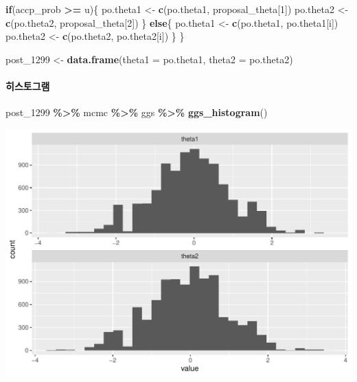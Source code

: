 \documentclass[
]{article}
\newenvironment{Shaded}{\begin{snugshade}}{\end{snugshade}}
\newcommand{\AttributeTok}[1]{\textcolor[rgb]{0.13,0.29,0.53}{#1}}
\newcommand{\ControlFlowTok}[1]{\textcolor[rgb]{0.13,0.29,0.53}{\textbf{#1}}}
\newcommand{\DecValTok}[1]{\textcolor[rgb]{0.00,0.00,0.81}{#1}}
\newcommand{\FunctionTok}[1]{\textcolor[rgb]{0.13,0.29,0.53}{\textbf{#1}}}
\newcommand{\NormalTok}[1]{#1}
\newcommand{\OtherTok}[1]{\textcolor[rgb]{0.56,0.35,0.01}{#1}}
\newcommand{\SpecialCharTok}[1]{\textcolor[rgb]{0.81,0.36,0.00}{\textbf{#1}}}
\begin{document}
\begin{Shaded}
\begin{Highlighting}[]
  \ControlFlowTok{if}\NormalTok{(accp\_prob }\SpecialCharTok{\textgreater{}=}\NormalTok{ u)\{}
\NormalTok{    po.theta1 }\OtherTok{\textless{}{-}} \FunctionTok{c}\NormalTok{(po.theta1, proposal\_theta[}\DecValTok{1}\NormalTok{])}
\NormalTok{    po.theta2 }\OtherTok{\textless{}{-}} \FunctionTok{c}\NormalTok{(po.theta2, proposal\_theta[}\DecValTok{2}\NormalTok{])}
\NormalTok{  \} }\ControlFlowTok{else}\NormalTok{\{}
\NormalTok{    po.theta1 }\OtherTok{\textless{}{-}} \FunctionTok{c}\NormalTok{(po.theta1, po.theta1[i])}
\NormalTok{    po.theta2 }\OtherTok{\textless{}{-}} \FunctionTok{c}\NormalTok{(po.theta2, po.theta2[i])}
\NormalTok{  \}}
\NormalTok{\}}

\NormalTok{post\_1299 }\OtherTok{\textless{}{-}} \FunctionTok{data.frame}\NormalTok{(}\AttributeTok{theta1 =}\NormalTok{ po.theta1, }\AttributeTok{theta2 =}\NormalTok{ po.theta2)}
\end{Highlighting}
\end{Shaded}

\paragraph{히스토그램}\label{uxd788uxc2a4uxd1a0uxadf8uxb7a8-1}

\begin{Shaded}
\begin{Highlighting}[]
\NormalTok{post\_1299 }\SpecialCharTok{\%\textgreater{}\%}\NormalTok{ mcmc }\SpecialCharTok{\%\textgreater{}\%}\NormalTok{ ggs }\SpecialCharTok{\%\textgreater{}\%} \FunctionTok{ggs\_histogram}\NormalTok{()}
\end{Highlighting}
\end{Shaded}

\begin{center}\includegraphics[width=0.8\linewidth]{Bayes_stat_hw3_files/figure-latex/unnamed-chunk-9-1} \end{center}
\end{document}
